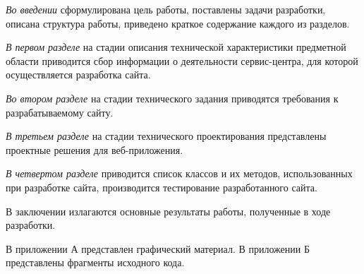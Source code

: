 \emph{Во введении} сформулирована цель работы, поставлены задачи разработки, описана структура работы, приведено краткое содержание каждого из разделов.

\emph{В первом разделе} на стадии описания технической характеристики предметной области приводится сбор информации о деятельности сервис-центра, для которой осуществляется разработка сайта.

\emph{Во втором разделе} на стадии технического задания приводятся требования к разрабатываемому сайту.

\emph{В третьем разделе} на стадии технического проектирования представлены проектные решения для веб-приложения.

\emph{В четвертом разделе} приводится список классов и их методов, использованных при разработке сайта, производится тестирование разработанного сайта.

В заключении излагаются основные результаты работы, полученные в ходе разработки.

В приложении А представлен графический материал.
В приложении Б представлены фрагменты исходного кода. 
